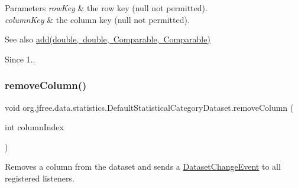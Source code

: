 \begin{DoxyParams}{Parameters}
{\em row\+Key} & the row key ({\ttfamily null} not permitted). \\
\hline
{\em column\+Key} & the column key ({\ttfamily null} not permitted).\\
\hline
\end{DoxyParams}
\begin{DoxySeeAlso}{See also}
\mbox{\hyperlink{classorg_1_1jfree_1_1data_1_1statistics_1_1_default_statistical_category_dataset_a85a6a03116003a566a7b85bb2f6ec644}{add(double, double, Comparable, Comparable)}}
\end{DoxySeeAlso}
\begin{DoxySince}{Since}
1.. 
\end{DoxySince}
\mbox{\label{classorg_1_1jfree_1_1data_1_1statistics_1_1_default_statistical_category_dataset_a1981755d8867127679bf11f59a7c62d4}} 
\subsubsection{\texorpdfstring{remove\+Column()}{removeColumn()}\hspace{0.1cm}{\footnotesize\ttfamily [1/2]}}
{\footnotesize\ttfamily void org.\+jfree.\+data.\+statistics.\+Default\+Statistical\+Category\+Dataset.\+remove\+Column (\begin{DoxyParamCaption}\item[{int}]{column\+Index }\end{DoxyParamCaption})}

Removes a column from the dataset and sends a \mbox{\hyperlink{}{Dataset\+Change\+Event}} to all registered listeners.



